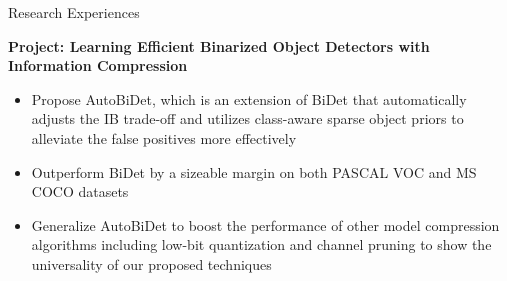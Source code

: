 \documentclass{resume} %
\begin{document}
\begin{rSection}{Research Experiences}
\vspace{-0.3cm}

\textbf{Project: Learning Efficient Binarized Object Detectors with Information Compression}
\begin{itemize}
    \item Propose AutoBiDet, which is an extension of BiDet that automatically adjusts the IB trade-off and utilizes class-aware sparse object priors to alleviate the false positives more effectively
    \item Outperform BiDet by a sizeable margin on both PASCAL VOC and MS COCO datasets
    \item Generalize AutoBiDet to boost the performance of other model compression algorithms including low-bit quantization and channel pruning to show the universality of our proposed techniques\newline
\end{itemize}

\iffalse
{\textbf{Tsinghua University}, Beijing, China} \hfill {\em Aug, 2018 -- Apr, 2019}\newline
\emph{\href{http://ivg.au.tsinghua.edu.cn/index.php}{Intelligent Vision Group}, Department of Automation}\newline
Research Assistant, Advisors: Profs. \href{https://www.tsinghua.edu.cn/publish/auen/1713/2011/20110506103534247867775/20110506103534247867775_.html}{Jianjiang Feng} \& \href{https://www.tsinghua.edu.cn/publish/auen/1713/2011/20110506105532098625469/20110506105532098625469_.html}{Jie Zhou}\newline
\textbf{Project: A Cascade Regression Model for Cardiac Landmark Detection}
\begin{itemize}
    \item Apply cascade method to achieve state-of-the-art cardiac landmark detection result
    \item Take the advantages of two structures that utilize global information and local context to get accurate and fast regression output
    \item Lay the foundation for weakly-supervised heart segmentation approaches in the future\newline
\end{itemize}
\fi

\iffalse
\textbf{Project: CFUN: Combining Faster R-CNN and U-net Network for Efficient Whole Heart Segmentation}
\begin{itemize}
    \item Propose a novel network architecture combining state-of-the-art object detection framework Faster R-CNN and segmentation framework U-net
    \item Introduce an elaborate-designed loss called edge loss which can greatly boost the ability of segmentation
    \item Achieve relatively competitive performances while reducing the time needed for medical image processing compared to state-of-the-art methods
\end{itemize}
\fi
\end{rSection}
\end{document}
